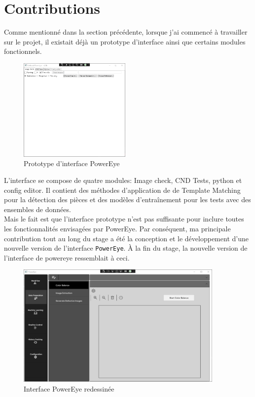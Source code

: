 \section{Contributions}
Comme mentionné dans la section précédente, lorsque j'ai commencé à travailler sur le projet, il existait déjà un prototype d'interface ainsi que certains modules fonctionnels.
\begin{figure}[H]
    \centering
    \includegraphics[height=5cm]{ressources/images/prototype.png}
    \caption{Prototype d'interface PowerEye}
\end{figure}
L'interface se compose de quatre modules: Image check, CND Tests, python et config editor. Il contient des méthodes d'application de de Template Matching pour la détection des pièces et des modèles d'entraînement pour les tests avec des ensembles de données.\\
Mais le fait est que l'interface prototype n'est pas suffisante pour inclure toutes les fonctionnalités envisagées par PowerEye. Par conséquent, ma principale contribution tout au long du stage a été la conception et le développement d'une nouvelle version de l'interface \texttt{PowerEye}. À la fin du stage, la nouvelle version de l'interface de powereye ressemblait à ceci. \\
\begin{figure}[h]
    \centering
    \includegraphics[height=6cm]{ressources/images/color_balance.png}
    \caption{Interface PowerEye redessinée}
\end{figure}
